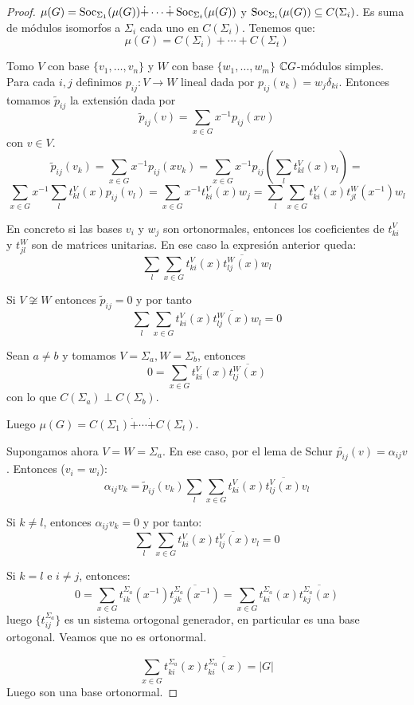 \begin{proof}
  \(\mu(G)=\operatorname{Soc}_{\Sigma_1}(\mu(G))\dot{+}\cdots\dot{+}\operatorname{Soc}_{\Sigma_t}(\mu(G))\)
  y \(\operatorname{Soc}_{\Sigma_i}(\mu(G))\subseteq C(\Sigma_i)\). Es suma de módulos
  isomorfos a \(\Sigma_i\) cada uno en \(C(\Sigma_i)\).
  Tenemos que:
  \[
    \mu(G)=C(\Sigma_i)+\cdots+C(\Sigma_t)
  \]

  Tomo \(V\) con base \(\{v_1,\ldots, v_n\}\) y \(W\) con base
  \(\{w_1,\ldots,w_m\}\) \(\mathbb{C} G\)-módulos simples. Para cada \(i,j\)
  definimos \(p_{ij}:V\longrightarrow W\) lineal dada por
  \(p_{ij}(v_k)=w_j\delta_{ki}\). Entonces tomamos
  \(\tilde{p}_{ij}\) la extensión dada por
  \[
    \tilde{p}_{ij}(v)=\sum_{x\in G}x^{-1} p_{ij}(xv)
  \]
  con \(v\in V\).
  \[
    \tilde{p}_{ij}(v_k)=\sum_{x\in G}x^{-1} p_{ij}(xv_k)=
  \sum_{x\in G}x^{-1} p_{ij}\left(\sum_l t^V_{kl}(x) v_l\right)=
\]\[
  \sum_{x\in G}x^{-1} \sum_l t^V_{kl}(x) p_{ij}(v_l)=
  \sum_{x\in G}x^{-1} t^V_{ki}(x) w_j=
  \sum_l\sum_{x\in G} t^V_{ki}(x) t_{jl}^W(x^{-1}) w_l
  \]

  En concreto si las bases \(v_i\) y \(w_j\) son ortonormales, entonces
  los coeficientes de \(t_{ki}^V\) y \(t_{jl}^W\) son de matrices
  unitarias. En ese caso la expresión anterior queda:
  \[
    \sum_l\sum_{x\in G} t^V_{ki}(x) \overline{t_{lj}^W(x)} w_l
  \]

  Si \(V\not\cong W\) entonces \(\tilde{p}_{ij}=0\) y por tanto
  \[
    \sum_l\sum_{x\in G} t^V_{ki}(x) \overline{t_{lj}^W(x)} w_l=0
  \]

  Sean \(a\neq b\) y tomamos \(V=\Sigma_a, W=\Sigma_b\), entonces
  \[
    0=\sum_{x\in G} t^V_{ki}(x) \overline{t_{lj}^W(x)}
  \]
  con lo que \(C(\Sigma_a)\perp C(\Sigma_b)\).

  Luego \(\mu(G)=C(\Sigma_1)\dot{+}\cdots\dot{+}C(\Sigma_t)\).

  Supongamos ahora \(V=W=\Sigma_a\). En ese caso, por el lema de Schur
  \(\tilde{p_{ij}}(v)=\alpha_{ij} v\). Entonces (\(v_i=w_i\)):
  \[
    \alpha_{ij} v_k = \tilde{p}_{ij}(v_k)
    \sum_l\sum_{x\in G} t^V_{ki}(x) \overline{t_{lj}^V(x)} v_l
  \]

  Si \(k\neq l\), entonces \(\alpha_{ij} v_k=0\) y por tanto:
  \[
    \sum_l\sum_{x\in G} t^V_{ki}(x) \overline{t_{lj}^V(x)} v_l=0
  \]

  Si \(k=l\) e \(i\neq j\), entonces:
  \[
    0=\sum_{x\in G}
    t_{ik}^{\Sigma_a}(x^{-1})\overline{t_{jk}^{\Sigma_a}(x^{-1})}
    =\sum_{x\in G} t_{ki}^{\Sigma_a}(x)\overline{t_{kj}^{\Sigma_a}(x)}
  \]
  luego \(\{t_{ij}^{\Sigma_a}\}\) es un sistema ortogonal generador,
  en particular es una base ortogonal. Veamos que no es ortonormal.

  \[
    \sum_{x\in G} t_{ki}^{\Sigma_a}(x)\overline{t_{ki}^{\Sigma_a}(x)}=
    |G|
  \]
  Luego son una base ortonormal.

\end{proof}
